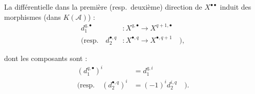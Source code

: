 La différentielle dans la première (resp.\ deuxième) direction de
$X^{\bullet\bullet}$ induit des morphismes (dans $K(\mathcal A)$) :
\[
\begin{aligned}
d_1^{q,\bullet}&\colon X^{q,\bullet}\longrightarrow X^{q+1,\bullet}\\
(\text{resp.}\quad
d_2^{\bullet,q}&\colon X^{\bullet,q}\longrightarrow X^{\bullet,q+1}\quad),
\end{aligned}
\]

dont les composants sont :
\[
\begin{aligned}
(d_1^{q,\bullet})^i&=d_1^{q,i}\\
(\text{resp.}\quad(d_2^{\bullet,q})^i&=(-1)^i d_2^{i,q}\quad).
\end{aligned}
\]
\endgroup
